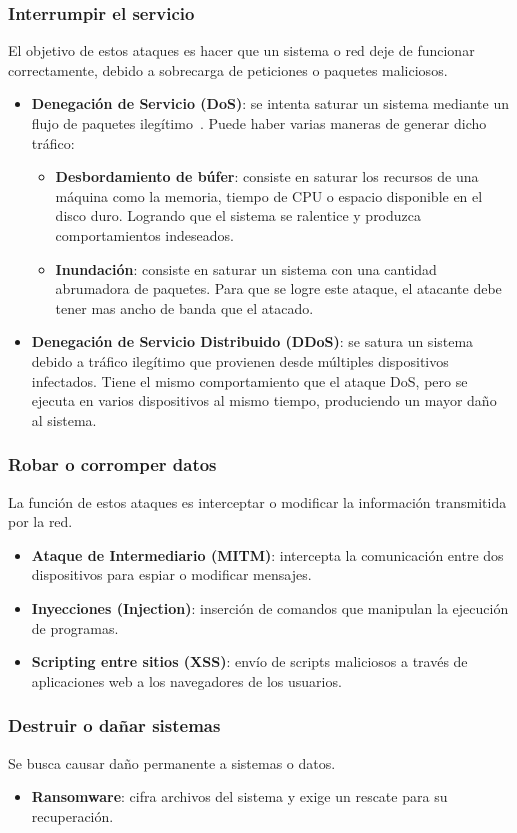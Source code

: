 \subsubsection{Interrumpir el servicio}
\label{subsubsec:interrumpir_servicio}
El objetivo de estos ataques es hacer que un sistema o red deje de funcionar correctamente, debido a sobrecarga de peticiones o paquetes maliciosos.
\begin{itemize}
    \item \textbf{Denegación de Servicio (DoS)}: se intenta saturar un sistema mediante un flujo de paquetes ilegítimo~\cite{ataque_dos}. Puede haber varias maneras de generar dicho tráfico:
    \begin{itemize}
        \item \textbf{Desbordamiento de búfer}: consiste en saturar los recursos de una máquina como la memoria, tiempo de CPU o espacio disponible en el disco duro. Logrando que el sistema se ralentice y produzca comportamientos indeseados.
        \item \textbf{Inundación}: consiste en saturar un sistema con una cantidad abrumadora de paquetes. Para que se logre este ataque, el atacante debe tener mas ancho de banda que el atacado.
    \end{itemize}
    \item \textbf{Denegación de Servicio Distribuido (DDoS)}: se satura un sistema debido a tráfico ilegítimo que provienen desde múltiples dispositivos infectados. Tiene el mismo comportamiento que el ataque DoS, pero se ejecuta en varios dispositivos al mismo tiempo, produciendo un mayor daño al sistema.
\end{itemize}

\subsubsection{Robar o corromper datos}
\label{subsubsec:robar_datos}
La función de estos ataques es interceptar o modificar la información transmitida por la red.
\begin{itemize}
    \item \textbf{Ataque de Intermediario (MITM)}: intercepta la comunicación entre dos dispositivos para espiar o modificar mensajes.
    \item \textbf{Inyecciones (Injection)}: inserción de comandos que manipulan la ejecución de programas.
    \item \textbf{Scripting entre sitios (XSS)}: envío de scripts maliciosos a través de aplicaciones web a los navegadores de los usuarios.
\end{itemize}

\subsubsection{Destruir o dañar sistemas}
\label{subsubsec:destruir_sistemas}
Se busca causar daño permanente a sistemas o datos.
\begin{itemize}
    \item \textbf{Ransomware}: cifra archivos del sistema y exige un rescate para su recuperación.
\end{itemize}

